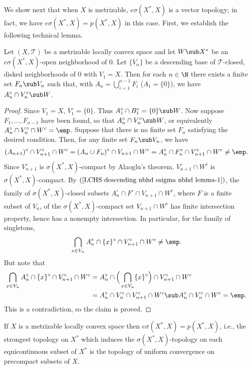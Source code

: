 We show next that when $X$ is metrizable, $e\sigma(X^*,X)$ is a vector topology; in fact, we have $e\sigma(X^*,X)=p(X^*,X)$ in this case. First, we establish the following technical lemma.
\begin{lemma}\label{LCHS descending nbhd esigma nbhd lemma}
Let $(X,\mathcal{T})$ be a metrizable locally convex space and let $W\sub X^*$ be an $e\sigma(X^*,X)$-open neighborhood of $0$. Let $\{V_n\}$ be a descending base of $\mathcal{T}$-closed, disked neighborhoods of $0$ with $V_1=X$. Then for each $n\in\N$ there exists a finite set $F_n\sub V_n$ such that, with $A_n=\bigcup_{i=1}^{n-1}F_i$ ($A_1=\{0\}$), we have $A_n^\circ\cap V_n^\circ\sub W$.
\end{lemma}
\begin{proof}
Since $V_1=X$, $V_1^\circ=\{0\}$. Thus $A_1^\circ\cap B_1^\circ=\{0\}\sub W$. Now suppose $F_1,\dots,F_{n-1}$ have been found, so that $A_n^\circ\cap V_n^\circ\sub W$, or equivalently $A_n^\circ\cap V_n^\circ\cap W^c=\emp$. Suppose that there is no finite set $F_n$ satisfying the desired condition. Then, for any finite set $F_n\sub V_n$, we have
\begin{align}\label{LCHS descending nbhd esigma nbhd lemma-1}
(A_{n+1})^\circ\cap V_{n+1}^\circ\cap W^c=(A_n\cup F_n)^\circ\cap V_{n+1}\cap W^c=A_n^\circ\cap F_n^\circ\cap V_{n+1}^\circ\cap W^c\neq\emp.
\end{align}
Since $V_{n+1}^\circ$ is $\sigma(X^*,X)$-compact by Alaoglu's theorem, $V_{n+1}^\circ\cap W^c$ is $\sigma(X^*,X)$-compact. By $(\ref{LCHS descending nbhd esigma nbhd lemma-1})$, the family of $\sigma(X^*,X)$-closed subsets $A_n^\circ\cap F^\circ\cap V_{n+1}\cap W^c$, where $F$ is a finite subset of $V_n$, of the $\sigma(X^*,X)$-compact set $V_{n+1}\cap W^c$ has finite intersection property, hence has a nonempty intersection. In particular, for the family of singletons,
\[\bigcap_{x\in V_n}A_n^\circ\cap\{x\}^\circ\cap V_{n+1}^\circ\cap W^c\neq\emp.\]
But note that
\begin{align*}
\bigcap_{x\in V_n}A_n^\circ\cap\{x\}^\circ\cap V_{n+1}^\circ\cap W^c&=A_n^\circ\cap\Big(\bigcap_{x\in V_n}\{x\}^\circ\Big)\cap V_{n+1}^\circ\cap W^c\\
&=A_n^\circ\cap V_n^\circ\cap V_{n+1}^\circ\cap W^c\sub A_n^\circ\cap V_n^\circ\cap W^c=\emp.
\end{align*}
This is a contradiction, so the claim is proved.
\end{proof}
\begin{theorem}
If $X$ is a metrizable locally convex space then $e\sigma(X^*,X)=p(X^*,X)$, i.e., the strongest topology on $X^*$ which induces the $\sigma(X^*,X)$-topology on each equicontinuous subset of $X^*$ is the topology of uniform convergence on precompact subsets of $X$.
\end{theorem}
